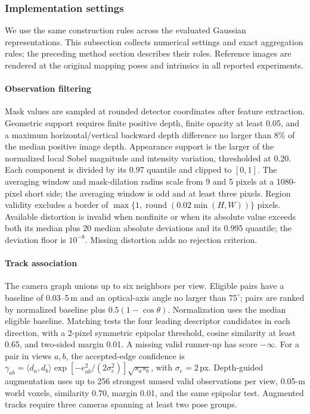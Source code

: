 \subsubsection{Implementation settings}
\label{sec:implementation}
We use the same construction rules across the evaluated Gaussian representations. This subsection collects numerical settings and exact aggregation rules; the preceding method section describes their roles. Reference images are rendered at the original mapping poses and intrinsics in all reported experiments.

\paragraph{Observation filtering}
Mask values are sampled at rounded detector coordinates after feature extraction. Geometric support requires finite positive depth, finite opacity at least 0.05, and a maximum horizontal/vertical backward depth difference no larger than 8\% of the median positive image depth. Appearance support is the larger of the normalized local Sobel magnitude and intensity variation, thresholded at 0.20. Each component is divided by its 0.97 quantile and clipped to $[0,1]$. The averaging window and mask-dilation radius scale from 9 and 5 pixels at a 1080-pixel short side; the averaging window is odd and at least three pixels. Region validity excludes a border of $\max\{1,\operatorname{round}(0.02\min(H,W))\}$ pixels. Available distortion is invalid when nonfinite or when its absolute value exceeds both its median plus 20 median absolute deviations and its 0.995 quantile; the deviation floor is $10^{-8}$. Missing distortion adds no rejection criterion.

\paragraph{Track association}
The camera graph unions up to six neighbors per view. Eligible pairs have a baseline of 0.03--5\,m and an optical-axis angle no larger than $75^\circ$; pairs are ranked by normalized baseline plus $0.5(1-\cos\theta)$. Normalization uses the median eligible baseline. Matching tests the four leading descriptor candidates in each direction, with a 2-pixel symmetric epipolar threshold, cosine similarity at least 0.65, and two-sided margin 0.01. A missing valid runner-up has score $-\infty$. For a pair in views $a,b$, the accepted-edge confidence is
$\gamma_{ab}=\langle d_a,d_b\rangle\exp[-e_{ab}^2/(2\sigma_e^2)]\sqrt{s_as_b}$,
with $\sigma_e=2$\,px. Depth-guided augmentation uses up to 256 strongest unused valid observations per view, 0.05-m world voxels, similarity 0.70, margin 0.01, and the same epipolar test. Augmented tracks require three cameras spanning at least two pose groups.

